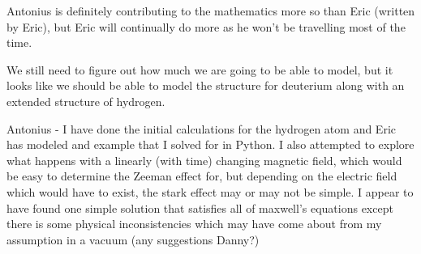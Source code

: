 \documentclass[11pt]{article}
\begin{document}
Antonius is definitely contributing to the mathematics more so than Eric (written by Eric), but Eric will continually do more as he won't be travelling most of the time.

We still need to figure out how much we are going to be able to model, but it looks like we should be able to model the structure for deuterium along with an extended structure of hydrogen.

Antonius - I have done the initial calculations for the hydrogen atom and Eric has modeled and example that I solved for in Python. I also attempted to explore what happens with a linearly (with time) changing magnetic field, which would be easy to determine the Zeeman effect for, but depending on the electric field which would have to exist, the stark effect may or may not be simple. I appear to have found one simple solution that satisfies all of maxwell's equations except there is some physical inconsistencies which may have come about from my assumption in a vacuum (any suggestions Danny?)

\end{document}

